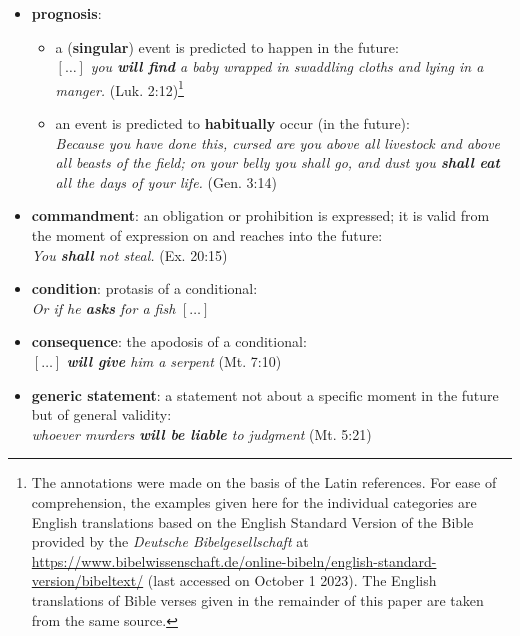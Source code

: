 \documentclass[output=paper,colorlinks,citecolor=brown]{langscibook}
\begin{document}
\begin{itemize}
    \item \textbf{prognosis}: 
    \begin{itemize}
        \item a (\textbf{singular}) event is predicted to happen in the future: \\
        $[\ldots]$ \textit{you \textbf{will find} a baby wrapped in swaddling cloths and lying in a manger.} (Luk. 2:12)\footnote{The annotations were made on the basis of the Latin references. For ease of comprehension, the examples given here for the individual categories are English translations based on the English Standard Version of the Bible provided by the \textit{Deutsche Bibelgesellschaft} at \href{https://www.bibelwissenschaft.de/online-bibeln/english-standard-version/bibeltext/}{https://www.bibelwissenschaft.de/online-bibeln/english-standard-version/bibeltext/} (last accessed on October 1 2023). The English translations of Bible verses given in the remainder of this paper are taken from the same source.}
        \item an event is predicted to \textbf{habitually} occur (in the future):\\
        \textit{Because you have done this, cursed are you above all livestock and above all beasts of the field; on your belly you shall go, and dust you \textbf{shall eat} all the days of your life.} (Gen. 3:14)
    \end{itemize}
    \item \textbf{commandment}: an obligation or prohibition is expressed; it is valid from the moment of expression on and reaches into the future:\\
    \textit{You \textbf{shall} not steal.} (Ex. 20:15)
    \item \textbf{condition}: protasis of a conditional:\\
    \textit{Or if he \textbf{asks} for a fish} $[\ldots]$
    \item \textbf{consequence}: the apodosis of a conditional:\\
     $[\ldots]$ \textit{\textbf{will give} him a serpent} (Mt. 7:10)
    \item \textbf{generic statement}: a statement not about a specific moment in the future but of general validity: \\
    \textit{whoever murders \textbf{will be liable} to judgment} (Mt. 5:21)
\end{itemize}
\end{document}
